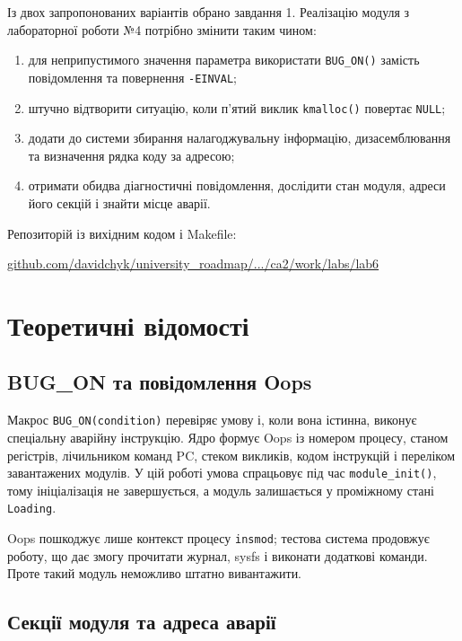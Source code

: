 \documentclass[12pt,a4paper]{article}
\begin{document}
Із двох запропонованих варіантів обрано завдання 1. Реалізацію модуля з
лабораторної роботи №4 потрібно змінити таким чином:

\begin{enumerate}[leftmargin=*]
  \item для неприпустимого значення параметра використати
    \texttt{BUG\_ON()} замість повідомлення та повернення
    \texttt{-EINVAL};
  \item штучно відтворити ситуацію, коли п'ятий виклик
    \texttt{kmalloc()} повертає \texttt{NULL};
  \item додати до системи збирання налагоджувальну інформацію,
    дизасемблювання та визначення рядка коду за адресою;
  \item отримати обидва діагностичні повідомлення, дослідити стан модуля,
    адреси його секцій і знайти місце аварії.
\end{enumerate}

Репозиторій із вихідним кодом і Makefile:
\begin{center}
\href{https://github.com/davidchyk/university_roadmap/tree/main/semester5/ca2/work/labs/lab6}{github.com/davidchyk/university\_roadmap/.../ca2/work/labs/lab6}
\end{center}

\section{Теоретичні відомості}

\subsection{BUG\_ON та повідомлення Oops}

Макрос \texttt{BUG\_ON(condition)} перевіряє умову і, коли вона істинна,
виконує спеціальну аварійну інструкцію. Ядро формує Oops із номером процесу,
станом регістрів, лічильником команд PC, стеком викликів, кодом інструкцій і
переліком завантажених модулів. У цій роботі умова спрацьовує під час
\texttt{module\_init()}, тому ініціалізація не завершується, а модуль
залишається у проміжному стані \texttt{Loading}.

Oops пошкоджує лише контекст процесу \texttt{insmod}; тестова система
продовжує роботу, що дає змогу прочитати журнал, sysfs і виконати додаткові
команди. Проте такий модуль неможливо штатно вивантажити.

\subsection{Секції модуля та адреса аварії}
\end{document}
